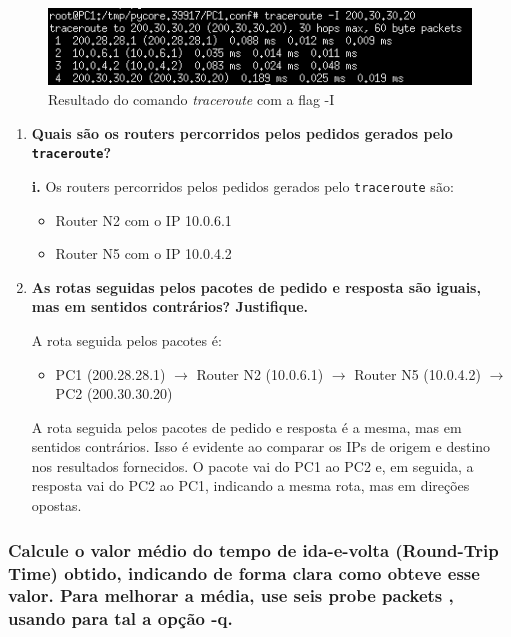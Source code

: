 \documentclass{article}
\begin{document}
\begin{figure}[h]
    \centering
    \includegraphics[width=0.8\linewidth]{images/traceroute-finI.png}
    \caption{Resultado do comando \textit{traceroute} com a flag -I}
    \label{fig:enter-label}
\end{figure}

\begin{enumerate}    
    \item \textbf{Quais são os routers percorridos pelos pedidos gerados pelo \texttt{traceroute}?}

    \textbf{i.} Os routers percorridos pelos pedidos gerados pelo \texttt{traceroute} são:
    
    \begin{itemize}
        \item Router N2 com o IP 10.0.6.1
        \item Router N5 com o IP 10.0.4.2
    \end{itemize}

    \item \textbf{As rotas seguidas pelos pacotes de pedido e resposta são iguais, mas em sentidos contrários? Justifique.}

    A rota seguida pelos pacotes é:
    \begin{itemize}
        \item PC1 (200.28.28.1) $\rightarrow$ Router N2 (10.0.6.1) $\rightarrow$ Router N5 (10.0.4.2) $\rightarrow$ PC2 (200.30.30.20)
    \end{itemize}

    A rota seguida pelos pacotes de pedido e resposta é a mesma, mas em sentidos contrários. Isso é evidente ao comparar os IPs de origem e destino nos resultados fornecidos. O pacote vai do PC1 ao PC2 e, em seguida, a resposta vai do PC2 ao PC1, indicando a mesma rota, mas em direções opostas.
\end{enumerate}

\subsubsection{Calcule o valor médio do tempo de ida-e-volta (Round-Trip Time) obtido, indicando de forma clara como obteve esse valor. Para melhorar a média, use seis probe packets , usando para tal a opção -q.}
\end{document}
